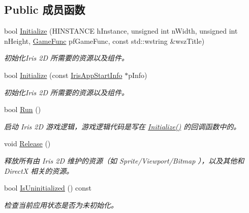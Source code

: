 \subsection*{Public 成员函数}
\begin{DoxyCompactItemize}
\item 
bool \hyperlink{class_iris2_d_1_1_iris_application_a84f3ddebb3a3ffb0c172bd41fb952e1a}{Initialize} (H\+I\+N\+S\+T\+A\+N\+CE h\+Instance, unsigned int n\+Width, unsigned int n\+Height, \hyperlink{class_iris2_d_1_1_iris_application_ac74720e6cd3a1968f73e92ea99675884}{Game\+Func} pf\+Game\+Func, const std\+::wstring \&wsz\+Title)
\begin{DoxyCompactList}\small\item\em 初始化\+Iris 2D 所需要的资源以及组件。 \end{DoxyCompactList}\item 
bool \hyperlink{class_iris2_d_1_1_iris_application_ac20656815694f980fccfc4369727a9a9}{Initialize} (const \hyperlink{struct_iris2_d_1_1_iris_application_1_1_iris_app_start_info}{Iris\+App\+Start\+Info} $\ast$p\+Info)
\begin{DoxyCompactList}\small\item\em 初始化\+Iris 2D 所需要的资源以及组件。 \end{DoxyCompactList}\item 
bool \hyperlink{class_iris2_d_1_1_iris_application_ae6bb59365978c945201fd8cf82105e4f}{Run} ()
\begin{DoxyCompactList}\small\item\em 启动 Iris 2D 游戏逻辑，游戏逻辑代码是写在 \hyperlink{class_iris2_d_1_1_iris_application_a84f3ddebb3a3ffb0c172bd41fb952e1a}{Initialize()} 的回调函数中的。 \end{DoxyCompactList}\item 
\mbox{\label{class_iris2_d_1_1_iris_application_a486d999a8d9e96f21b9d064d10d15b96}} 
void \hyperlink{class_iris2_d_1_1_iris_application_a486d999a8d9e96f21b9d064d10d15b96}{Release} ()
\begin{DoxyCompactList}\small\item\em 释放所有由 Iris 2D 维护的资源（如 Sprite/\+Viewport/\+Bitmap ），以及其他和 DirectX 相关的资源。 \end{DoxyCompactList}\item 
bool \hyperlink{class_iris2_d_1_1_iris_application_a1035e03a186b934ecf57371e42475eea}{Is\+Uninitialized} () const
\begin{DoxyCompactList}\small\item\em 检查当前应用状态是否为未初始化。 \end{DoxyCompactList}\item 

\end{DoxyCompactItemize}
